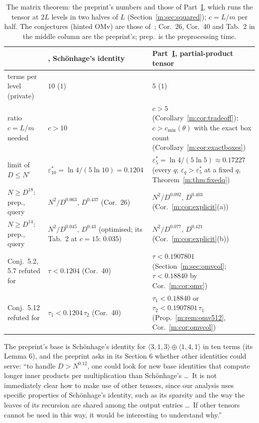 \documentclass[11pt]{article}
\theoremstyle{definition}
\theoremstyle{remark}
\newcommand{\es}{\varepsilon^*_5}
\newcommand{\et}{\varepsilon^*_{10}}
\newcommand{\HintedOMvRfourteen}{0.18840}%
\newcommand{\HintedOMvRtwenty}{0.1907801}%
\begin{document}
\begin{table}[ht]
\centering\small
\renewcommand{\arraystretch}{1.15}\setlength{\tabcolsep}{4pt}
\begin{tabular}{@{}>{\raggedright}p{}>{\raggedright}p{}>{\raggedright\arraybackslash}p{}@{}}
 & \cite{ZT}, Schönhage's identity & Part~\hyperref[m:partI]{I}, partial-product tensor\\\hline
terms per level (private) & $10$ ($1$) & $5$ ($1$)\\
ratio $c=L/m$ needed & $c>10$ & $c>5$ (Corollary~\ref{m:cor:tradeoff}); $c>c_{\min}(\theta)$ with the exact box count (Corollary~\ref{m:cor:exactboxes})\\
limit of $D\le N^{\varepsilon}$ & $\et=\ln4/(5\ln10)=0.1204$ & $\es=\ln4/(5\ln5)\approx0.17227$ (every $q$; $\varepsilon_q>\es$ at a fixed $q$, Theorem~\ref{m:thm:fixedq})\\
$N\ge D^{18}$: prep., query & $N^2/D^{0.063}$, $D^{0.437}$ (Cor.~26) & $N^2/D^{0.092}$, $D^{0.403}$ (Cor.~\ref{m:cor:explicit}(a))\\
$N\ge D^{14}$: prep., query & $N^2/D^{0.045}$, $D^{0.43}$ (optimised; its Tab.~2 at $c=15$: $0.035$) & $N^2/D^{0.077}$, $D^{0.421}$ (Cor.~\ref{m:cor:explicit}(b))\\
Conj.~5.2, 5.7 refuted for & $\tau<0.1204$ (Cor.~40) & $\tau<\HintedOMvRtwenty$ (Section~\ref{m:sec:omvcol}; $\tau<\HintedOMvRfourteen$ by Cor.~\ref{m:cor:omv})\\
Conj.~5.12 refuted for & $\tau_1<0.1204\,\tau_2$ (Cor.~40) & $\tau_1<\HintedOMvRfourteen$ or $\tau_2<\HintedOMvRtwenty\,\tau_1$ (Prop.~\ref{m:rem:omv512}, Cor.~\ref{m:cor:omvcol})
\end{tabular}
\caption{The matrix theorem: the preprint's numbers and those of Part~\hyperref[m:partI]{I}, which runs the tensor at $2L$ levels in two halves of $L$ (Section~\ref{m:sec:squared}); $c=L/m$ per half. The conjectures (hinted OMv) are those of~\cite{BNS19}; Cor.~26, Cor.~40 and Tab.~2 in the middle column are the preprint's; prep.\ is the preprocessing time.}
\label{tab:matrix}
\end{table}

The preprint's base is Schönhage's identity for $\langle3,1,3\rangle\oplus\langle1,4,1\rangle$ in ten terms (its Lemma 6), and the preprint asks in its Section 6 whether other identities could serve: ``to handle $D>N^{0.12}$, one could look for new base identities that compute longer inner products per multiplication than Schönhage's \ldots\ It is not immediately clear how to make use of other tensors, since our analysis uses specific properties of Schönhage's identity, such as its sparsity and the way the leaves of its recursion are shared among the output entries \ldots\ If other tensors cannot be used in this way, it would be interesting to understand why.''
\end{document}
